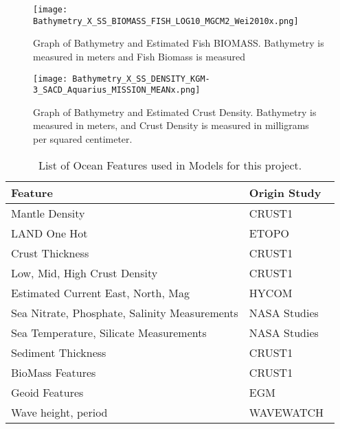 \begin{figure}[htp]
    \centering
    \texttt{[image: Bathymetry\_X\_SS\_BIOMASS\_FISH\_LOG10\_MGCM2\_Wei2010x.png]}
    \caption[Graph of Bathymetry and Fish Biomass]{Graph of Bathymetry and Estimated Fish BIOMASS. Bathymetry is measured in meters and Fish Biomass is measured }
    \label{fig:bathyxfish}
\end{figure}

\begin{figure}[htp]
    \centering
    \texttt{[image: Bathymetry\_X\_SS\_DENSITY\_KGM-3\_SACD\_Aquarius\_MISSION\_MEANx.png]}
    \caption[Graph of Bathymetry and Crust Density]{Graph of Bathymetry and Estimated Crust Density.
    Bathymetry is measured in meters, and Crust Density is measured in milligrams per squared centimeter.}
    \label{fig:bathyxdensity}
\end{figure}

%

\newpage

\begin{table}[htp]
    \centering
    \caption{List of Ocean Features used in Models for this project.}
    \begin{tabular}{ |p{} p{}| }
        \hline
            \textbf{Feature} & \textbf{Origin Study} \\
            \hline
            Mantle Density & CRUST1~\cite{laske2013update} \\
            LAND One Hot & ETOPO~\cite{national1988etopo} \\
            Crust Thickness & CRUST1~\cite{laske2013update} \\
            Low, Mid, High Crust Density & CRUST1~\cite{laske2013update} \\
            Estimated Current East, North, Mag & HYCOM~\cite{chassignet2009us} \\
            Sea Nitrate, Phosphate, Salinity Measurements & NASA Studies~\cite{meissner2018salinity,parekh2005decoupling}  \\
            Sea Temperature, Silicate Measurements & NASA Studies \\
            Sediment Thickness & CRUST1~\cite{laske2013update} \\
            BioMass Features &CRUST1~\cite{wei2010global} \\
            Geoid Features & EGM~\cite{pavlis2008earth} \\
            Wave height, period & WAVEWATCH~\cite{tolman20072007} \\
        \hline
    \end{tabular}
    \label{table:FEATURE_LIST}
\end{table}
